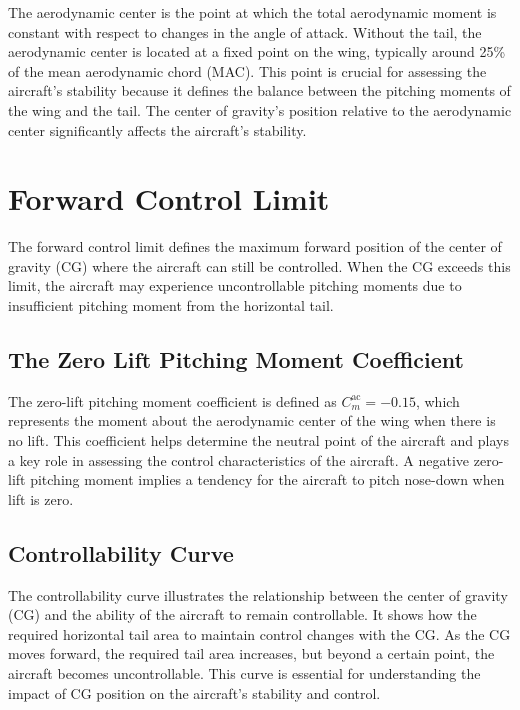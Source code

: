 \documentclass[12pt]{report}
\begin{document}
The aerodynamic center is the point at which the total aerodynamic moment is constant with respect to changes in the angle of attack. Without the tail, the aerodynamic center is located at a fixed point on the wing, typically around 25\% of the mean aerodynamic chord (MAC). This point is crucial for assessing the aircraft’s stability because it defines the balance between the pitching moments of the wing and the tail. The center of gravity's position relative to the aerodynamic center significantly affects the aircraft's stability.

\section{Forward Control Limit}

The forward control limit defines the maximum forward position of the center of gravity (CG) where the aircraft can still be controlled. When the CG exceeds this limit, the aircraft may experience uncontrollable pitching moments due to insufficient pitching moment from the horizontal tail.

\subsection{The Zero Lift Pitching Moment Coefficient}

The zero-lift pitching moment coefficient is defined as \( C_m^\text{ac} = -0.15 \), which represents the moment about the aerodynamic center of the wing when there is no lift. This coefficient helps determine the neutral point of the aircraft and plays a key role in assessing the control characteristics of the aircraft. A negative zero-lift pitching moment implies a tendency for the aircraft to pitch nose-down when lift is zero.

\subsection{Controllability Curve}

The controllability curve illustrates the relationship between the center of gravity (CG) and the ability of the aircraft to remain controllable. It shows how the required horizontal tail area to maintain control changes with the CG. As the CG moves forward, the required tail area increases, but beyond a certain point, the aircraft becomes uncontrollable. This curve is essential for understanding the impact of CG position on the aircraft’s stability and control.
\end{document}

